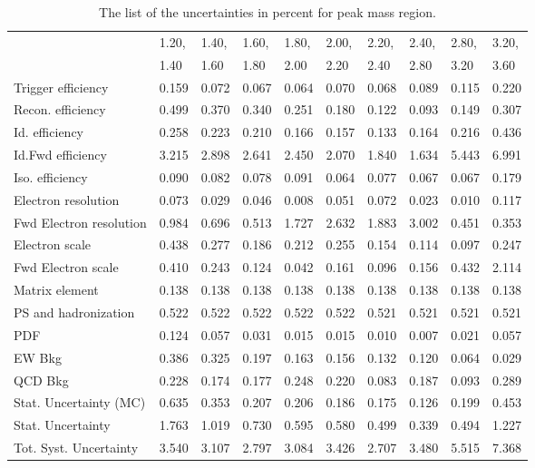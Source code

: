 \begin{table}
\centering
\begin{tabular}{l p{0.6cm}p{0.6cm}p{0.6cm}p{0.6cm}p{0.6cm}p{0.6cm}p{0.6cm}p{0.6cm}l}
\hline
   & 1.20, & 1.40, & 1.60, & 1.80, & 2.00, & 2.20, & 2.40, & 2.80, & 3.20, \\
   & 1.40 & 1.60 & 1.80 & 2.00 & 2.20 & 2.40 & 2.80 & 3.20 & 3.60  \\
\hline
Trigger efficiency            & 0.159 & 0.072 & 0.067 & 0.064 & 0.070 & 0.068 & 0.089 & 0.115 & 0.220 \\
Recon. efficiency             & 0.499 & 0.370 & 0.340 & 0.251 & 0.180 & 0.122 & 0.093 & 0.149 & 0.307 \\
Id. efficiency                & 0.258 & 0.223 & 0.210 & 0.166 & 0.157 & 0.133 & 0.164 & 0.216 & 0.436 \\
Id.Fwd efficiency             & 3.215 & 2.898 & 2.641 & 2.450 & 2.070 & 1.840 & 1.634 & 5.443 & 6.991 \\
Iso. efficiency               & 0.090 & 0.082 & 0.078 & 0.091 & 0.064 & 0.077 & 0.067 & 0.067 & 0.179 \\
Electron resolution           & 0.073 & 0.029 & 0.046 & 0.008 & 0.051 & 0.072 & 0.023 & 0.010 & 0.117 \\
Fwd Electron resolution       & 0.984 & 0.696 & 0.513 & 1.727 & 2.632 & 1.883 & 3.002 & 0.451 & 0.353 \\
Electron scale                & 0.438 & 0.277 & 0.186 & 0.212 & 0.255 & 0.154 & 0.114 & 0.097 & 0.247 \\
Fwd Electron scale            & 0.410 & 0.243 & 0.124 & 0.042 & 0.161 & 0.096 & 0.156 & 0.432 & 2.114 \\
Matrix element                & 0.138 & 0.138 & 0.138 & 0.138 & 0.138 & 0.138 & 0.138 & 0.138 & 0.138 \\
PS and hadronization          & 0.522 & 0.522 & 0.522 & 0.522 & 0.522 & 0.521 & 0.521 & 0.521 & 0.521 \\
PDF                           & 0.124 & 0.057 & 0.031 & 0.015 & 0.015 & 0.010 & 0.007 & 0.021 & 0.057 \\
EW Bkg                        & 0.386 & 0.325 & 0.197 & 0.163 & 0.156 & 0.132 & 0.120 & 0.064 & 0.029 \\
QCD Bkg                       & 0.228 & 0.174 & 0.177 & 0.248 & 0.220 & 0.083 & 0.187 & 0.093 & 0.289 \\
\hline
Stat. Uncertainty (MC)        & 0.635 & 0.353 & 0.207 & 0.206 & 0.186 & 0.175 & 0.126 & 0.199 & 0.453 \\
Stat. Uncertainty             & 1.763 & 1.019 & 0.730 & 0.595 & 0.580 & 0.499 & 0.339 & 0.494 & 1.227 \\
\hline
Tot. Syst. Uncertainty        & 3.540 & 3.107 & 2.797 & 3.084 & 3.426 & 2.707 & 3.480 & 5.515 & 7.368 \\
\hline
\end{tabular}
\caption{The list of the uncertainties in percent for peak mass region.}
\label{tab:Zee_unc_list_peak}
\end{table}

